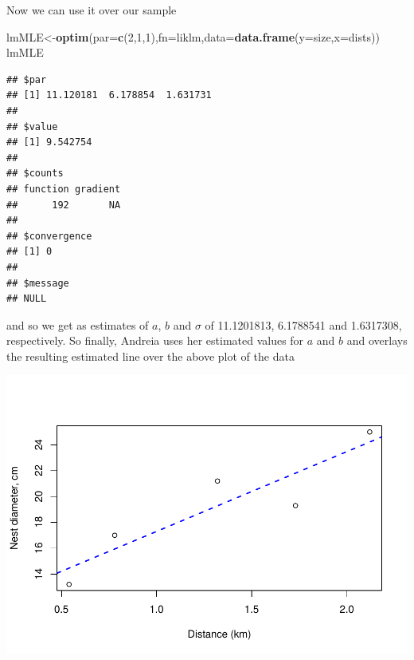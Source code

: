 \documentclass[
]{book}
\newenvironment{Shaded}{\begin{snugshade}}{\end{snugshade}}
\newcommand{\AttributeTok}[1]{\textcolor[rgb]{0.13,0.29,0.53}{#1}}
\newcommand{\DecValTok}[1]{\textcolor[rgb]{0.00,0.00,0.81}{#1}}
\newcommand{\FunctionTok}[1]{\textcolor[rgb]{0.13,0.29,0.53}{\textbf{#1}}}
\newcommand{\NormalTok}[1]{#1}
\newcommand{\OtherTok}[1]{\textcolor[rgb]{0.56,0.35,0.01}{#1}}
\newcommand{\SpecialCharTok}[1]{\textcolor[rgb]{0.81,0.36,0.00}{\textbf{#1}}}
\newcommand{\StringTok}[1]{\textcolor[rgb]{0.31,0.60,0.02}{#1}}
\begin{document}
Now we can use it over our sample

\begin{Shaded}
\begin{Highlighting}[]
\NormalTok{lmMLE}\OtherTok{\textless{}{-}}\FunctionTok{optim}\NormalTok{(}\AttributeTok{par=}\FunctionTok{c}\NormalTok{(}\DecValTok{2}\NormalTok{,}\DecValTok{1}\NormalTok{,}\DecValTok{1}\NormalTok{),}\AttributeTok{fn=}\NormalTok{liklm,}\AttributeTok{data=}\FunctionTok{data.frame}\NormalTok{(}\AttributeTok{y=}\NormalTok{size,}\AttributeTok{x=}\NormalTok{dists))}
\NormalTok{lmMLE}
\end{Highlighting}
\end{Shaded}

\begin{verbatim}
## $par
## [1] 11.120181  6.178854  1.631731
## 
## $value
## [1] 9.542754
## 
## $counts
## function gradient 
##      192       NA 
## 
## $convergence
## [1] 0
## 
## $message
## NULL
\end{verbatim}

and so we get as estimates of \(a\), \(b\) and \(\sigma\) of 11.1201813, 6.1788541 and 1.6317308, respectively. So finally, Andreia uses her estimated values for \(a\) and \(b\) and overlays the resulting estimated line over the above plot of the data

\begin{Shaded}
\end{Shaded}

\includegraphics{ECOMODbook_files/figure-latex/ch13.29-1.pdf}
\end{document}
